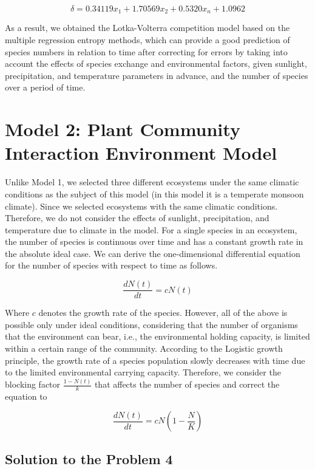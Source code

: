 \documentclass[12pt]{article}
\begin{document}
\begin{equation}
	\delta = 0.34119 x_1 + 1.70569 x_2 + 0.5320 x_n + 1.0962
\end{equation}

As a result, we obtained the Lotka-Volterra competition model based on the multiple regression entropy methods, which can provide a good prediction of species numbers in relation to time after correcting for errors by taking into account the effects of species exchange and environmental factors, given sunlight, precipitation, and temperature parameters in advance, and the number of species over a period of time.

\section{Model 2: Plant Community Interaction Environment Model}

Unlike Model 1, we selected three different ecosystems under the same climatic conditions as the subject of this model (in this model it is a temperate monsoon climate). Since we selected ecosystems with the same climatic conditions. Therefore, we do not consider the effects of sunlight, precipitation, and temperature due to climate in the model. For a single species in an ecosystem, the number of species is continuous over time and has a constant growth rate in the absolute ideal case. We can derive the one-dimensional differential equation for the number of species with respect to time as follows.

\begin{equation}
	\frac{dN(t)}{dt} = cN(t)
\end{equation}

Where $c$ denotes the growth rate of the species. However, all of the above is possible only under ideal conditions, considering that the number of organisms that the environment can bear, i.e., the environmental holding capacity, is limited within a certain range of the community. According to the Logistic growth principle, the growth rate of a species population slowly decreases with time due to the limited environmental carrying capacity. Therefore, we consider the blocking factor $\frac{1-N(t)}{k}$ that affects the number of species and correct the equation to

\begin{equation}
	\frac{dN(t)}{dt} = cN(1 - \frac{N}{K})
\end{equation}

\subsection{Solution to the Problem 4}
\end{document}

